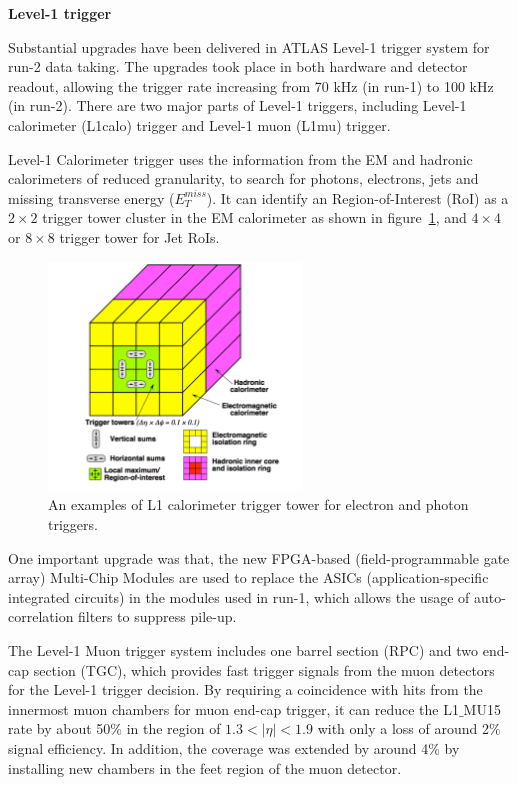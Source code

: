 \textbf{Level-1 trigger}

Substantial upgrades have been delivered in ATLAS Level-1 trigger system for run-2 data taking.
The upgrades took place in both hardware and detector readout, allowing the trigger rate increasing from 70 kHz (in run-1) to 100 kHz (in run-2).
There are two major parts of Level-1 triggers, including Level-1 calorimeter (L1calo) trigger and Level-1 muon (L1mu) trigger.

Level-1 Calorimeter trigger uses the information from the EM and hadronic calorimeters of reduced granularity, to search for photons, electrons, jets and missing transverse energy ($E_{T}^{miss}$).
It can identify an Region-of-Interest (RoI) as a $2 \times 2$ trigger tower cluster in the EM calorimeter as shown in figure~\ref{fig:trig_tower}, 
and $4 \times 4$ or $8 \times 8$ trigger tower for Jet RoIs.
\begin{figure}[!htb]
  \centering
  \includegraphics[width=0.6\textwidth]{figures/Detector/trig_tower.png}
  \caption{An examples of L1 calorimeter trigger tower for electron and photon triggers\cite{Pasztor:2063746}.}
  \label{fig:trig_tower}
\end{figure}
One important upgrade was that, the new FPGA-based (field-programmable gate array) Multi-Chip Modules are used to replace the ASICs (application-specific integrated circuits) in the modules used in run-1,
which allows the usage of auto-correlation filters to suppress pile-up.

The Level-1 Muon trigger system includes one barrel section (RPC) and two end-cap section (TGC), which provides fast trigger signals from the muon detectors for the Level-1 trigger decision.
By requiring a coincidence with hits from the innermost muon chambers for muon end-cap trigger, it can reduce the L1$\_$MU15 rate by about 50\% in the region of $1.3 < |\eta| < 1.9$ with only a loss of around 2\% signal efficiency.
In addition, the coverage was extended by around 4\% by installing new chambers in the feet region of the muon detector.

